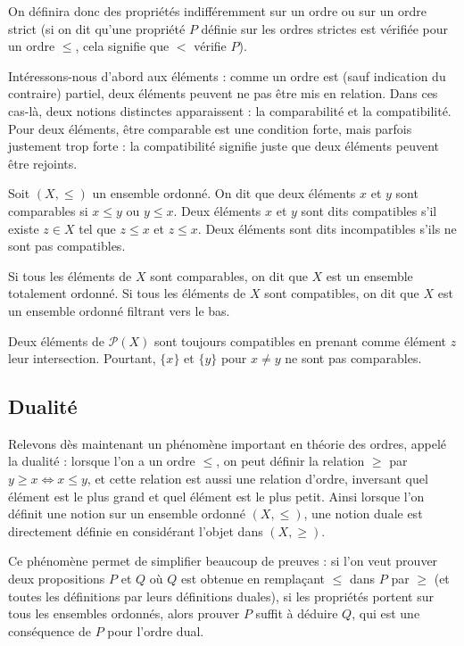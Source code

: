 On définira donc des propriétés indifféremment sur un ordre ou sur un ordre
strict (si on dit qu'une propriété $P$ définie sur les ordres strictes est
vérifiée pour un ordre $\leq$, cela signifie que $<$ vérifie $P$).

Intéressons-nous d'abord aux éléments : comme un ordre est (sauf indication du
contraire) partiel, deux éléments peuvent ne pas être mis en relation. Dans ces
cas-là, deux notions distinctes apparaissent : la comparabilité et la
compatibilité. Pour deux éléments, être comparable est une condition forte,
mais parfois justement trop forte : la compatibilité signifie juste que deux
éléments peuvent être rejoints.

\begin{definition}
  Soit $(X,\leq)$ un ensemble ordonné. On dit que deux éléments $x$ et $y$ sont
  comparables si $x\leq y$ ou $y\leq x$. Deux éléments $x$ et $y$ sont dits
  compatibles s'il existe $z \in X$ tel que $z\leq x$ et $z\leq x$. Deux
  éléments sont dits incompatibles s'ils ne sont pas compatibles.

  Si tous les éléments de $X$ sont comparables, on dit que $X$ est un ensemble
  totalement ordonné.
  Si tous les éléments de $X$ sont compatibles, on dit que $X$ est un ensemble
  ordonné filtrant vers le bas.
\end{definition}

\begin{example}
  Deux éléments de $\mathcal P(X)$ sont toujours compatibles en prenant comme
  élément $z$ leur intersection. Pourtant, $\{x\}$ et $\{y\}$ pour $x\neq y$ ne
  sont pas comparables.
\end{example}

\subsection{Dualité}

Relevons dès maintenant un phénomène important en théorie des ordres, appelé la
dualité : lorsque l'on a un ordre $\leq$, on peut définir la relation $\geq$
par $y\geq x \iff x\leq y$, et cette relation est aussi une relation d'ordre,
inversant quel élément est le plus grand et quel élément est le plus petit.
Ainsi lorsque l'on définit une notion sur un ensemble ordonné $(X,\leq)$, une
notion duale est directement définie en considérant l'objet dans $(X,\geq)$.

Ce phénomène permet de simplifier beaucoup de preuves : si l'on veut prouver
deux propositions $P$ et $Q$ où $Q$ est obtenue en remplaçant $\leq$ dans $P$
par $\geq$ (et toutes les définitions par leurs définitions duales), si les
propriétés portent sur tous les ensembles ordonnés, alors prouver $P$ suffit à
déduire $Q$, qui est une conséquence de $P$ pour l'ordre dual.

